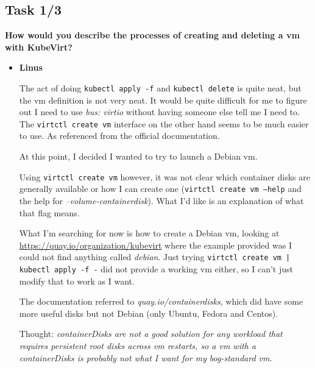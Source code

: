 \documentclass{kththesis}
\begin{document}
\begin{enumerate}
\section{Task 1/3}
\noindent \textbf{How would you describe the processes of creating and deleting a \Gls{vm} with KubeVirt?}
\begin{itemize}

\item \textbf{Linus}

The act of doing \texttt{kubectl apply -f} and \texttt{kubectl delete} is quite neat, but the \Gls{vm} definition is not very neat. It would be quite difficult for me to figure out I need to use \textit{bus: virtio} without having someone else tell me I need to. The \texttt{virtctl create vm} interface on the other hand seems to be much easier to use. As referenced from the official documentation.

At this point, I decided I wanted to try to launch a Debian \Gls{vm}.

Using \texttt{virtctl create vm} however, it was not clear which container disks are generally available or how I can create one (\texttt{virtctl create vm --help} and the help for \textit{--volume-containerdisk}). What I'd like is an explanation of what that flag means.

What I'm searching for now is how to create a Debian \Gls{vm}, looking at \url{https://quay.io/organization/kubevirt} where the example provided was I could not find anything called \textit{debian}. Just trying \texttt{virtctl create vm | kubectl apply -f -} did not provide a working \Gls{vm} either, so I can't just modify that to work as I want.

The documentation referred to \textit{quay.io/containerdisks}, which did have some more useful disks but not Debian (only Ubuntu, Fedora and Centos).

Thought: \textit{containerDisks are not a good solution for any workload that requires persistent root disks across \Gls{vm} restarts, so a \Gls{vm} with a {containerDisks} is probably not what I want for my bog-standard \Gls{vm}.}


\end{itemize}
\end{enumerate}
\end{document}
